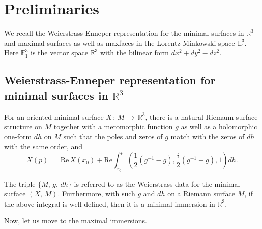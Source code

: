 \documentclass[12pt,epsfig,tikz,multi]{amsart}
\numberwithin{equation}{section}
\begin{document}
\section{\textbf{Preliminaries}}

We recall the Weierstrass-Enneper representation for the minimal surfaces in $\mathbb R^3$ and maximal 
surfaces as well as maxfaces in the Lorentz Minkowski space $\mathbb E_1^3$. Here $\mathbb{E}_1^3$ is the vector space 
$\mathbb{R}^3$ with the bilinear form $dx^2+dy^2-dz^2$.

\subsection{Weierstrass-Enneper representation for minimal surfaces in $\mathbb R^3$}

For an oriented minimal surface $X\,:\, M\,\longrightarrow\,
{\mathbb R}^3$, there is a natural Riemann surface structure on $M$ together with a
meromorphic function $g$ as well as a holomorphic one-form $dh$ on $M$ such that the poles and zeros of $g$ match 
with the zeros of $dh$ with the same order, and
\begin{equation}
X(p) \,=\, \text{Re}\, X(x_0)+ \text{Re} \int^p_{x_0} \left(\frac{1}{2} (g^{-1} - g)  , \frac{ i }{2} ( g^{-1} + g ), 1 \right)dh.
\end{equation}

The triple $\lbrace M,\,g,\,dh \rbrace$ is referred to as the Weierstrass data for the minimal surface $(X,\,
M)$. Furthermore, with such $g$ and $dh$ on a Riemann surface $M$, if the above integral is well defined, then it
is a minimal immersion in ${\mathbb R}^3$.

Now, let us move to the maximal immersions.
\end{document}
